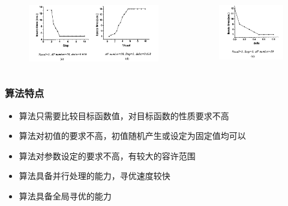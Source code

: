 \begin{frame}
	\begin{columns}
	\begin{figure}
		\includegraphics[width=1.0\textwidth]{pic/fish7.png}
	\end{figure}
	\begin{figure}
		\flushleft
		\includegraphics[width=1.0\textwidth]{pic/fish8.png}
	\end{figure}
	\end{columns}
\end{frame}
\begin{frame}
	\frametitle{算法特点}
	\begin{itemize}
		\item{算法只需要比较目标函数值，对目标函数的性质要求不高}
		\item{算法对初值的要求不高，初值随机产生或设定为固定值均可以}
		\item{算法对参数设定的要求不高，有较大的容许范围}
		\item{算法具备并行处理的能力，寻优速度较快}
		\item{算法具备全局寻优的能力}
	\end{itemize}
\end{frame}
